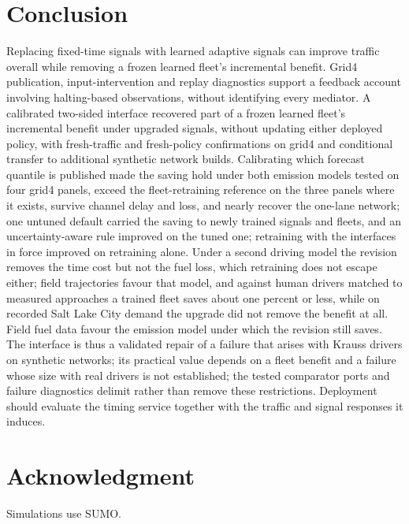 \section{Conclusion}\label{sec:conclusion}
Replacing fixed-time signals with learned adaptive signals can improve traffic overall while removing a frozen learned fleet's incremental
benefit. Grid4 publication, input-intervention and replay diagnostics support a feedback account involving halting-based observations,
without identifying every mediator. A calibrated two-sided interface recovered part of a frozen learned fleet's incremental benefit under
upgraded signals, without updating either deployed policy, with fresh-traffic and fresh-policy confirmations on grid4 and conditional
transfer to additional synthetic network builds. Calibrating which forecast quantile is published made the saving hold under both
emission models tested on four grid4 panels, exceed the fleet-retraining reference on the three panels where it exists, survive channel
delay and loss, and nearly recover the one-lane network; one untuned default carried the saving to newly trained signals and fleets, and
an uncertainty-aware rule improved on the tuned one; retraining with the interfaces in force improved on retraining alone. Under a second
driving model the revision removes the time cost but not the fuel loss, which retraining does not escape either; field trajectories favour
that model, and against human drivers matched to measured approaches a trained fleet saves about one percent or less, while on recorded Salt
Lake City demand the upgrade did not remove the benefit at all. Field fuel data favour the emission model under which the revision still
saves. The interface is thus a validated repair of a failure that arises with Krauss drivers on synthetic networks; its practical value depends
on a fleet benefit and a failure whose size with real drivers is not established; the tested comparator ports and failure
diagnostics delimit rather than remove these restrictions. Deployment should evaluate the timing service together with the
traffic and signal responses it induces.

\section*{Acknowledgment}
Simulations use SUMO.

